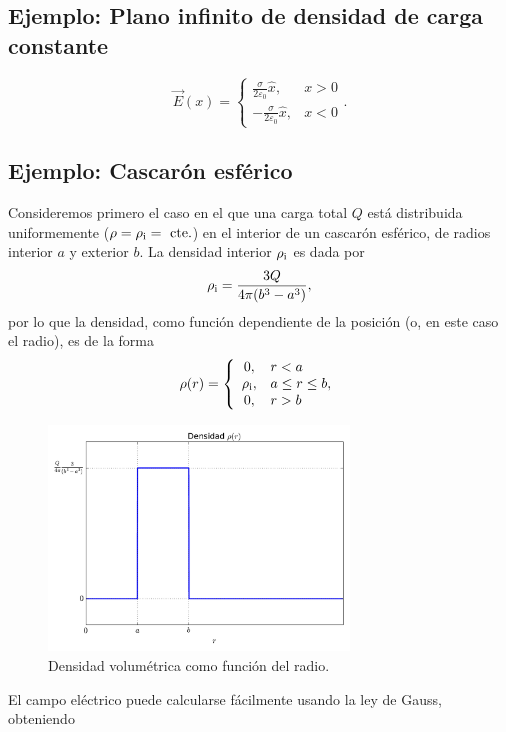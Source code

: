 \subsection{Ejemplo: Plano infinito de densidad de carga constante}
\begin{equation}
\vec{E}(x)=\left\{\begin{array}{rl}\frac{\sigma}{2\varepsilon_0}\hat{x},& x>0 \\
-\frac{\sigma}{2\varepsilon_0}\hat{x},& x<0 \end{array}\right. .
\end{equation}

\subsection{Ejemplo: Cascarón esférico}
Consideremos primero el caso en el que una carga total $Q$ está distribuida uniformemente ($\rho=\rho_{\rm i}=\text{ cte.}$) en el interior de un cascarón esférico, de radios interior $a$ y exterior $b$.
La densidad interior $\rho_{\rm i}$ es dada por
\begin{equation}
\rho_{\rm i} = \frac{3Q}{4\pi(b^3-a^3)},
\end{equation}
por lo que la densidad, como función dependiente de la posición (o, en este caso el radio), es de la forma
\begin{equation}
\rho(r)=\left\{\begin{array}{cl}
0, & r<a\\
\rho_{\rm i}, & a\le r\le b,\\
0, & r>b
\end{array}\right.
\end{equation}
\begin{figure}[!h]
\centerline{\includegraphics[height=6cm]{fig/fig-esfera-hueca-densidad.pdf}}
\caption{Densidad volumétrica como función del radio.}
\label{fig_ehd}
\end{figure}
El campo eléctrico puede calcularse fácilmente usando la ley de Gauss, obteniendo

